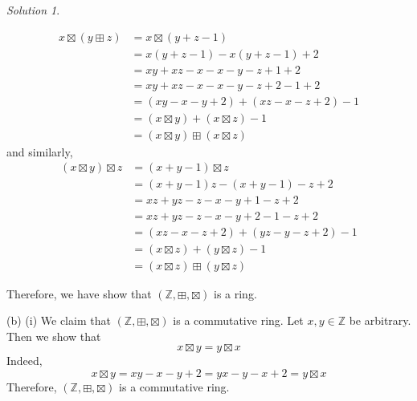 \documentclass[11pt]{amsart}
\theoremstyle{definition}\newtheorem{question}{Question}
\theoremstyle{definition}\newtheorem{claim}{Claim}
\theoremstyle{remark}\newtheorem*{solution}{Solution}
\newcommand{\Z}{\mathbb{Z}}
\begin{document}
\begin{solution}
\begin{itemize}
\begin{align*}
            x \boxtimes (y \boxplus z) &= x \boxtimes (y + z - 1) \\
            &= x(y + z - 1) - x (y + z - 1) + 2 \\
            &= xy + xz - x - x - y - z + 1 + 2 \\
            &= xy + xz - x - x - y - z + 2 - 1 + 2 \\
            &= (xy - x - y + 2) + (xz - x - z + 2) - 1 \\
            &= (x \boxtimes y) + (x \boxtimes z) - 1 \\
            &= (x \boxtimes y) \boxplus (x \boxtimes z)
        \end{align*}
        and similarly,
        \begin{align*}
            (x \boxtimes y) \boxtimes z &= (x + y - 1) \boxtimes z \\
            &= (x + y - 1)z - (x + y - 1) - z + 2 \\
            &= xz + yz - z - x - y + 1 - z + 2 \\
            &= xz + yz - z - x - y + 2 - 1 - z + 2 \\
            &= (xz - x - z + 2) + (yz - y - z + 2) - 1 \\
            &= (x \boxtimes z) + (y \boxtimes z) - 1 \\
            &= (x \boxtimes z) \boxplus (y \boxtimes z)
        \end{align*}
    \end{itemize}
    Therefore, we have show that $(\Z, \boxplus, \boxtimes)$ is a ring.

    (b) (i) We claim that $(\Z, \boxplus, \boxtimes)$ is a commutative ring. Let $x, y \in \Z$ be arbitrary. Then we show that
    \begin{equation*}
        x \boxtimes y = y \boxtimes x
    \end{equation*}
    Indeed,
    \begin{equation*}
        x \boxtimes y = xy - x - y + 2 = yx - y - x + 2 = y \boxtimes x
    \end{equation*}
    Therefore, $(\Z, \boxplus, \boxtimes)$ is a commutative ring.


\end{solution}
\end{document}
